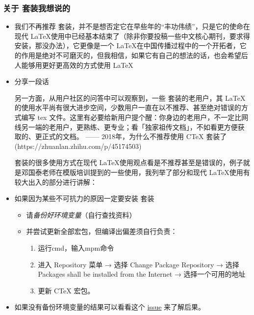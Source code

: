\subsubsection{关于 \CTeX 套装我想说的}

\begin{itemize}
  \item 我们不再推荐 \CTeX 套装，并不是想否定它在早些年的“丰功伟绩”，只是它的使命在现代 \LaTeX 使用中已经基本结束了（除非你要投稿一些中文核心期刊，要求得安装，那没办法），它更像是一个 \LaTeX 在中国传播过程中的一个开拓者，它的作用是绝对不可磨灭的，但我相信，如果它有自己的想法的话，也会希望后人能够用更好更高效的方式使用 \LaTeX
  
  \item 分享一段话
    \begin{latexexample}[gobble = 6]
      另一方面，从用户社区的问答中可以观察到，一些 \CTeX 套装的老用户，其 LaTeX 的使用水平尚有很大进步空间，少数用户一直在以不推荐、甚至绝对错误的方式编写 tex 文件。这里有必要给新用户提个醒：你身边的老用户，不一定比网线另一端的老用户，更熟练、更专业；看「独家祖传文档」，不如看更方便获取的、更正式的文档。
      —— 2018年，为什么不推荐使用 CTeX 套装了(https://zhuanlan.zhihu.com/p/45174503)
    \end{latexexample}
  
    \CTeX 套装的很多使用方式在现代 \LaTeX 使用观点看是不推荐甚至是错误的，例子就是邓国泰老师在模版培训提到的一些使用，我列举了部分和现代 \LaTeX 使用有较大出入的部分进行讲解：
  
  \item 如果因为某些不可抗力的原因一定要安装 \CTeX 套装
    \begin{itemize}
      \item 请\emph{备份好环境变量}（自行查找资料）
      \item 并尝试更新全部宏包，但编译出偏差须自行负责：
        \begin{enumerate}
          \item 运行cmd，输入mpm命令
          \item 进入 Repository 菜单 → 选择 Change Package Repository → 选择 Packages shall be installed from the Internet → 选择一个可用的地址
          \item 更新 CTeX 宏包。
        \end{enumerate}
    \end{itemize}
    
  \item 如果没有备份环境变量的结果可以看看这个 \href{https://github.com/CTeX-DEV/CTeX/issues/19}{issue} 来了解后果。
\end{itemize}


